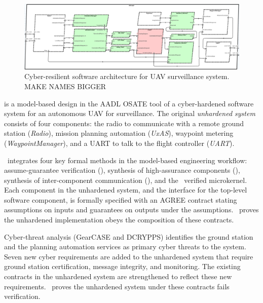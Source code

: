 \begin{figure}
	\begin{center}
	  \includegraphics[width=\textwidth]{./figs/sw-hardened.png}
  \end{center}
	\caption{Cyber-resilient software architecture for UAV surveillance system. MAKE NAMES BIGGER} 
	\label{fig:sw-hardened} 
\end{figure}

 is a model-based design in the AADL OSATE tool of a cyber-hardened software
system for an autonomous UAV for surveillance.
The original \emph{unhardened system} consists of four components: the radio to communicate with a
remote ground
station (\emph{Radio}), mission planning automation (\emph{UxAS}), waypoint metering
(\emph{WaypointManager}), and a UART to talk to the flight controller (\emph{UART}).

\briefcase\ integrates four key formal methods in the model-based engineering workflow:
assume-guarantee verification (\agree), synthesis of high-assurance components (\splat), synthesis
of inter-component communication (\hamr), and the \selFour\ verified microkernel.
Each component in the unhardened system, and the interface for the top-level software component, is
formally specified with an AGREE contract stating assumptions on inputs and guarantees on outputs
under the assumptions.
\agree\ proves the unhardened implementation obeys the composition of these contracts. 

Cyber-threat analysis (GearCASE and DCRYPPS) identifies the ground station and the planning
automation services as primary cyber threats to the system.
Seven new cyber requirements are added to the unhardened system that require ground station
certification, message integrity, and monitoring.
The existing contracts in the unhardened system are strengthened to reflect these new requirements.
\agree\ proves the unhardened system under these contracts fails verification. 

